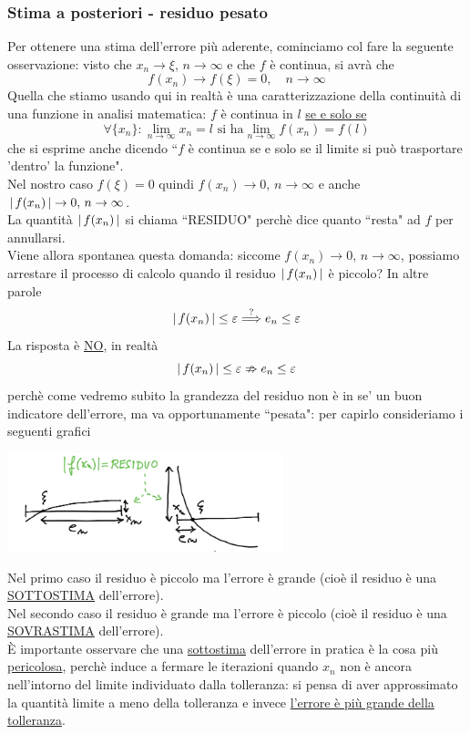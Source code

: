 \documentclass[12pt]{article}
\DeclarePairedDelimiter{\abs}{\lvert}{\rvert}
\begin{document}
\subsubsection{Stima a posteriori - residuo pesato}
Per ottenere una stima dell'errore più aderente, cominciamo col fare la seguente osservazione: visto che $x_n \to \xi,\,n\to \infty$ e che $f$ è continua, si avrà che \[f(x_n) \to f(\xi)=0,\quad n \to \infty\]
Quella che stiamo usando qui in realtà è una caratterizzazione della continuità di una funzione in analisi matematica: $f$ è continua in $l$ \uline{se e solo se}
\[\forall \{x_n\}:\lim_{n\to \infty}x_n=l \text{ si ha} \lim_{n\to \infty}f(x_n)=f(l)\]
che si esprime anche dicendo ``$f$ è continua se e solo se il limite si può trasportare 'dentro' la funzione".\\
Nel nostro caso $f(\xi)=0$ quindi $f(x_n) \to 0,\,n \to \infty$ e anche $\abs{\,f(x_n)\,}\to 0,\,n \to \infty$.\\
La quantità $\abs{\,f(x_n)\,}$ si chiama ``RESIDUO" perchè dice quanto ``resta" ad $f$ per annullarsi.\\
Viene allora spontanea questa domanda: siccome $f(x_n) \to 0,\,n \to \infty$, possiamo arrestare il processo di calcolo quando il residuo $\abs{\,f(x_n)\,}$ è piccolo? In altre parole
\[\abs{\,f(x_n)\,}\le \varepsilon \overset{?}{\Longrightarrow} e_n \le \varepsilon\]
La risposta è \uline{NO}, in realtà\\
\[\abs{\,f(x_n)\,}\le \varepsilon \nRightarrow e_n\le \varepsilon\]
perchè come vedremo subito la grandezza del residuo non è in se' un buon indicatore dell'errore, ma va opportunamente ``pesata": per capirlo consideriamo i seguenti grafici\\
\begin{center}
    \includegraphics[width=0.6\textwidth]{grafo4.png}
\end{center}
Nel primo caso il residuo è piccolo ma l'errore è grande (cioè il residuo è una \uline{SOTTOSTIMA} dell'errore).\\
Nel secondo caso il residuo è grande ma l'errore è piccolo (cioè il residuo è una \uline{SOVRASTIMA} dell'errore).\\
È importante osservare che una \uline{sottostima} dell'errore in pratica è la cosa più \uline{pericolosa}, perchè induce a fermare le iterazioni quando $x_{n}$ non è ancora nell'intorno del limite individuato dalla tolleranza: si pensa di aver approssimato la quantità limite a meno della tolleranza e invece \uline{l'errore è più grande della tolleranza}.\\
\end{document}
